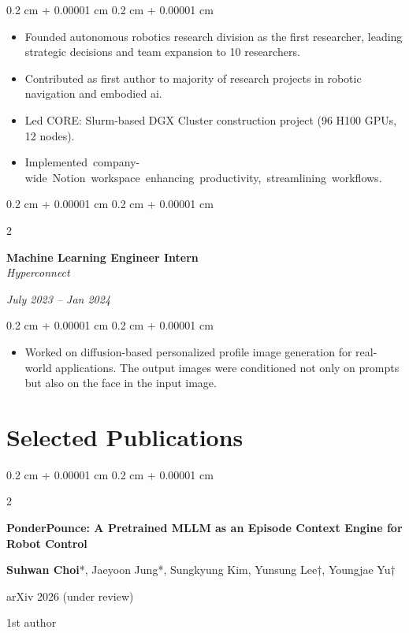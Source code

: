 \documentclass[10pt, letterpaper]{article}
\newenvironment{highlights}{
    \begin{itemize}[
        topsep=0.10 cm,
        parsep=0.10 cm,
        partopsep=0pt,
        itemsep=0pt,
        leftmargin=0.4 cm + 10pt
    ]
}{
    \end{itemize}
} %
\newenvironment{onecolentry}{
    \begin{adjustwidth}{
        0.2 cm + 0.00001 cm
    }{
        0.2 cm + 0.00001 cm
    }
}{
    \end{adjustwidth}
} %
\newenvironment{twocolentry}[2][]{
    \onecolentry
    \def\secondColumn{#2}
    \setcolumnwidth{\fill, 4.5 cm}
    \begin{paracol}{2}
}{
    \switchcolumn \raggedleft \secondColumn
    \end{paracol}
    \endonecolentry
} %
\newenvironment{pubentry}[2][]{
    \onecolentry
    \def\secondColumn{#2}
    \setcolumnwidth{\fill, 2 cm}
    \begin{paracol}{2}
}{
    \switchcolumn \raggedleft \secondColumn
    \end{paracol}
    \endonecolentry
} %
\let\hrefWithoutArrow\href
\renewcommand{\href}[2]{\hrefWithoutArrow{#1}{\ifthenelse{\equal{#2}{}}{ }{#2 }\raisebox{.15ex}{\footnotesize \faExternalLink*}}}
\begin{document}
\vspace{0.10 cm}
\begin{onecolentry}
    \begin{highlights}
        \item Founded autonomous robotics research division as the first researcher, leading strategic decisions and team expansion to 10 researchers.
        \item Contributed as first author to majority of research projects in robotic navigation and embodied ai.
        \item Led CORE: Slurm-based DGX Cluster construction project (96 H100 GPUs, 12 nodes). \href{https://worv.ghost.io/core-construction/}{[Blog]}
        \item \mbox{Implemented company-wide Notion workspace enhancing productivity, streamlining workflows.} \href{https://milkclouds.notion.site/DBs-template-1816b908318e809e9f93ecbfe7d4ca86}{[Template]}
    \end{highlights}
\end{onecolentry}

\vspace{0.2 cm}

\begin{twocolentry}{
        \textit{July 2023 – Jan 2024}
    }
    \textbf{Machine Learning Engineer Intern}
    \\
    \textit{Hyperconnect}
\end{twocolentry}

\vspace{0.10 cm}
\begin{onecolentry}
    \begin{highlights}
        \item Worked on diffusion-based personalized profile image generation for real-world applications. The output images were conditioned not only on prompts but also on the face in the input image.
    \end{highlights}
\end{onecolentry}

\section{Selected Publications}

\begin{samepage}
    \begin{pubentry}{
            1st author
        }
        \textbf{PonderPounce: A Pretrained MLLM as an Episode Context Engine for Robot Control}

        \vspace{0.10 cm}

        \small \textbf{Suhwan Choi}*, Jaeyoon Jung*, Sungkyung Kim, Yunsung Lee†, Youngjae Yu†

        \vspace{0.10 cm}

        arXiv 2026 (under review) \href{https://arxiv.org/abs/2608.24115}{[arXiv]} \href{https://worv-ai.github.io/ponderpounce/}{[Website]}
    \end{pubentry}
\end{samepage}
\end{document}
